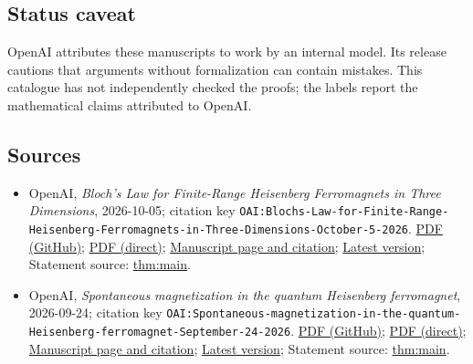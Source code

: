 \documentclass[11pt]{article}
\begin{document}
\subsection{Status caveat}
OpenAI attributes these manuscripts to work by an internal model. Its release cautions that arguments without formalization can contain mistakes. This catalogue has not independently checked the proofs; the labels report the mathematical claims attributed to OpenAI.

\subsection{Sources}
\begin{itemize}
\item OpenAI, \emph{Bloch's Law for Finite-Range Heisenberg Ferromagnets in Three Dimensions}, 2026-10-05; citation key \texttt{OAI:Blochs-Law-for-Finite-Range-Heisenberg-Ferromagnets-in-Three-Dimensions-October-5-2026}. \href{https://github.com/openai/math/blob/adc7f1241b42e322a6451854ab7e4b4c146bf78a/preprints/Blochs-Law-for-Finite-Range-Heisenberg-Ferromagnets-in-Three-Dimensions-October-5-2026/bloch-law-heisenberg.pdf}{PDF (GitHub)}; \href{https://github.com/openai/math/raw/adc7f1241b42e322a6451854ab7e4b4c146bf78a/preprints/Blochs-Law-for-Finite-Range-Heisenberg-Ferromagnets-in-Three-Dimensions-October-5-2026/bloch-law-heisenberg.pdf}{PDF (direct)}; \href{https://github.com/openai/math/blob/adc7f1241b42e322a6451854ab7e4b4c146bf78a/preprints/Blochs-Law-for-Finite-Range-Heisenberg-Ferromagnets-in-Three-Dimensions-October-5-2026/README.md}{Manuscript page and citation}; \href{https://github.com/openai/math/blob/main/preprints/Blochs-Law-for-Finite-Range-Heisenberg-Ferromagnets-in-Three-Dimensions-October-5-2026/bloch-law-heisenberg.pdf}{Latest version}; Statement source: \href{https://github.com/openai/math/blob/adc7f1241b42e322a6451854ab7e4b4c146bf78a/preprints/Blochs-Law-for-Finite-Range-Heisenberg-Ferromagnets-in-Three-Dimensions-October-5-2026/build/sections/01-introduction.tex\#L68}{thm:main}.
\item OpenAI, \emph{Spontaneous magnetization in the quantum Heisenberg ferromagnet}, 2026-09-24; citation key \texttt{OAI:Spontaneous-magnetization-in-the-quantum-Heisenberg-ferromagnet-September-24-2026}. \href{https://github.com/openai/math/blob/adc7f1241b42e322a6451854ab7e4b4c146bf78a/preprints/Spontaneous-magnetization-in-the-quantum-Heisenberg-ferromagnet-September-24-2026/paper.pdf}{PDF (GitHub)}; \href{https://github.com/openai/math/raw/adc7f1241b42e322a6451854ab7e4b4c146bf78a/preprints/Spontaneous-magnetization-in-the-quantum-Heisenberg-ferromagnet-September-24-2026/paper.pdf}{PDF (direct)}; \href{https://github.com/openai/math/blob/adc7f1241b42e322a6451854ab7e4b4c146bf78a/preprints/Spontaneous-magnetization-in-the-quantum-Heisenberg-ferromagnet-September-24-2026/README.md}{Manuscript page and citation}; \href{https://github.com/openai/math/blob/main/preprints/Spontaneous-magnetization-in-the-quantum-Heisenberg-ferromagnet-September-24-2026/paper.pdf}{Latest version}; Statement source: \href{https://github.com/openai/math/blob/adc7f1241b42e322a6451854ab7e4b4c146bf78a/preprints/Spontaneous-magnetization-in-the-quantum-Heisenberg-ferromagnet-September-24-2026/build/source/sections/00-introduction.tex\#L64}{thm:main}.

\end{itemize}
\end{document}
